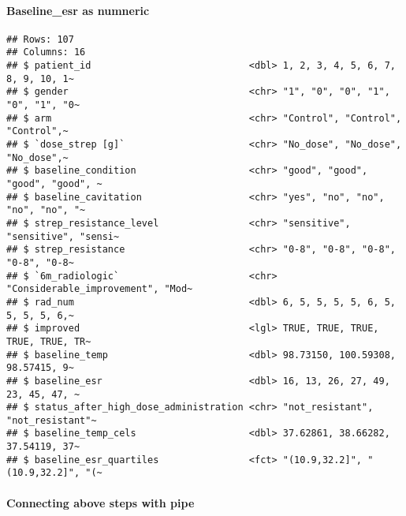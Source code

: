 \documentclass[
]{article}
\newenvironment{Shaded}{\begin{snugshade}}{\end{snugshade}}
\newcommand{\FunctionTok}[1]{\textcolor[rgb]{0.13,0.29,0.53}{\textbf{#1}}}
\newcommand{\NormalTok}[1]{#1}
\newcommand{\OtherTok}[1]{\textcolor[rgb]{0.56,0.35,0.01}{#1}}
\newcommand{\SpecialCharTok}[1]{\textcolor[rgb]{0.81,0.36,0.00}{\textbf{#1}}}
\begin{document}
\paragraph{Baseline\_esr as numneric}\label{baseline_esr-as-numneric}

\begin{Shaded}
\end{Shaded}

\begin{verbatim}
## Rows: 107
## Columns: 16
## $ patient_id                            <dbl> 1, 2, 3, 4, 5, 6, 7, 8, 9, 10, 1~
## $ gender                                <chr> "1", "0", "0", "1", "0", "1", "0~
## $ arm                                   <chr> "Control", "Control", "Control",~
## $ `dose_strep [g]`                      <chr> "No_dose", "No_dose", "No_dose",~
## $ baseline_condition                    <chr> "good", "good", "good", "good", ~
## $ baseline_cavitation                   <chr> "yes", "no", "no", "no", "no", "~
## $ strep_resistance_level                <chr> "sensitive", "sensitive", "sensi~
## $ strep_resistance                      <chr> "0-8", "0-8", "0-8", "0-8", "0-8~
## $ `6m_radiologic`                       <chr> "Considerable_improvement", "Mod~
## $ rad_num                               <dbl> 6, 5, 5, 5, 5, 6, 5, 5, 5, 5, 6,~
## $ improved                              <lgl> TRUE, TRUE, TRUE, TRUE, TRUE, TR~
## $ baseline_temp                         <dbl> 98.73150, 100.59308, 98.57415, 9~
## $ baseline_esr                          <dbl> 16, 13, 26, 27, 49, 23, 45, 47, ~
## $ status_after_high_dose_administration <chr> "not_resistant", "not_resistant"~
## $ baseline_temp_cels                    <dbl> 37.62861, 38.66282, 37.54119, 37~
## $ baseline_esr_quartiles                <fct> "(10.9,32.2]", "(10.9,32.2]", "(~
\end{verbatim}

\paragraph{Connecting above steps with
pipe}\label{connecting-above-steps-with-pipe}
\end{document}
